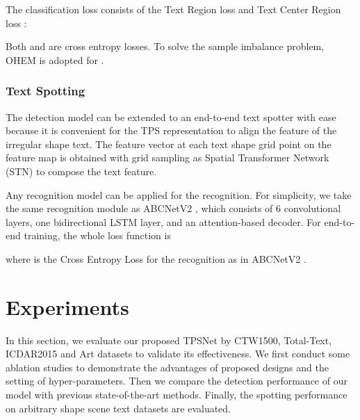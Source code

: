 \documentclass[sigconf]{acmart}
\begin{document}
	The classification loss consists of the Text Region loss  and Text Center Region loss :
	
	Both  and  are cross entropy losses. To solve the sample imbalance problem, OHEM \cite{zhu2021fourier} is adopted for .


	\subsubsection{Text Spotting}
	The detection model can be extended to an end-to-end text spotter with ease because it is convenient for the TPS representation to align the feature of the irregular shape text. The feature vector at each text shape grid point on the feature map is obtained with grid sampling as Spatial Transformer Network (STN) \cite{jaderberg2015spatial} to compose the text feature.
	
	Any recognition model can be applied for the recognition. For simplicity, we take the same recognition module as ABCNetV2 \cite{abcnetv2}, which consists of 6 convolutional layers, one bidirectional LSTM layer, and an attention-based decoder.  For end-to-end training, the whole loss function is 
	
	where  is the Cross Entropy Loss for the recognition as in ABCNetV2 \cite{abcnetv2}.
	
	\section{Experiments}
	In this section, we evaluate our proposed TPSNet by CTW1500, Total-Text,  ICDAR2015 and Art datasets to validate its effectiveness. We first conduct some ablation studies to demonstrate the advantages of proposed designs and the setting of hyper-parameters. Then we compare the detection performance of our model with previous state-of-the-art methods. Finally, the spotting performance on arbitrary shape scene text datasets are evaluated.
	
\end{document}
